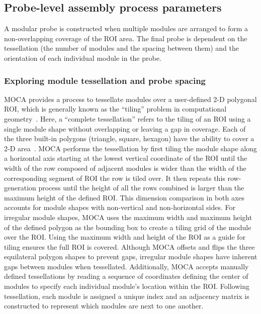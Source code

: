 \subsection{Probe-level assembly process parameters}
A modular probe is constructed when multiple modules are arranged to form a non-overlapping coverage of the \ac{ROI} area. The final probe is dependent on the tessellation (the number of modules and the spacing between them) and the orientation of each individual module in the probe.

\subsubsection{Exploring module tessellation and probe spacing}
\ac{MOCA} provides a process to tessellate modules over a user-defined 2-D polygonal \ac{ROI}, which is generally known as the ``tiling'' problem in computational geometry~\cite{Winslow2015}. Here, a ``complete tessellation'' refers to the tiling of an \ac{ROI} using a single module shape without overlapping or leaving a gap in coverage. Each of the three built-in polygons (triangle, square, hexagon) have the ability to cover a 2-D area~\cite{Samet1990}. \ac{MOCA} performs the tessellation by first tiling the module shape along a horizontal axis starting at the lowest vertical coordinate of the \ac{ROI} until the width of the row composed of adjacent modules is wider than the width of the corresponding segment of \ac{ROI} the row is tiled over. It then repeats this row-generation process until the height of all the rows combined is larger than the maximum height of the defined \ac{ROI}. This dimension comparison in both axes accounts for module shapes with non-vertical and non-horizontal sides. For irregular module shapes, \ac{MOCA} uses the maximum width and maximum height of the defined polygon as the bounding box to create a tiling grid of the module over the \ac{ROI}. Using the maximum width and height of the \ac{ROI} as a guide for tiling ensures the full \ac{ROI} is covered. Although \ac{MOCA} offsets and flips the three equilateral polygon shapes to prevent gaps, irregular module shapes have inherent gaps between modules when tessellated. Additionally, \ac{MOCA} accepts manually defined tessellations by reading a sequence of coordinates defining the center of modules to specify each individual module's location within the \ac{ROI}. Following tessellation, each module is assigned a unique index and an adjacency matrix is constructed to represent which modules are next to one another.

